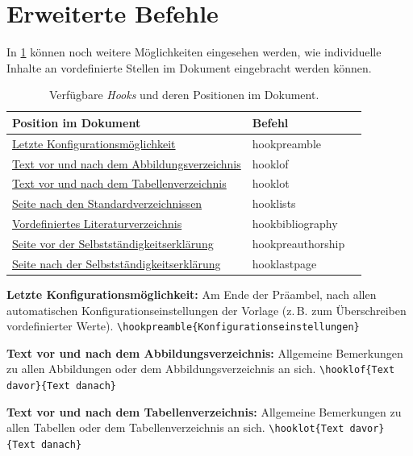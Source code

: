 	\section{Erweiterte Befehle}
	
	In \cref{tab:hooks} können noch weitere Möglichkeiten eingesehen werden, wie individuelle Inhalte an vordefinierte Stellen im Dokument eingebracht werden können.
	
	\begin{table}[!htb]
		\centering
		\caption{Verfügbare \textit{Hooks} und deren Positionen im Dokument.}
		\label{tab:hooks}
		\begin{tabular}{lll}
			\toprule
			\textbf{Position im Dokument} & \textbf{Befehl} \\
			\midrule
			\hyperref[cmd:hookpreamble]{Letzte Konfigurationsmöglichkeit} & hookpreamble \\
			\hyperref[cmd:hooklof]{Text vor und nach dem Abbildungsverzeichnis} & hooklof \\
			\hyperref[cmd:hooklot]{Text vor und nach dem Tabellenverzeichnis} & hooklot \\
			\hyperref[cmd:hooklists]{Seite nach den Standardverzeichnissen} & hooklists \\
			\hyperref[cmd:hookbibliography]{Vordefiniertes Literaturverzeichnis} & hookbibliography \\
			\hyperref[cmd:hookpreauthorship]{Seite vor der Selbstständigkeitserklärung} & hookpreauthorship \\
			\hyperref[cmd:hooklastpage]{Seite nach der Selbstständigkeitserklärung} & hooklastpage \\	
			\bottomrule
		\end{tabular}
	\end{table}
	
	\textbf{Letzte Konfigurationsmöglichkeit:}\label{cmd:hookpreamble}
	Am Ende der Präambel, nach allen automatischen Konfigurationseinstellungen der Vorlage (z.\,B. zum Überschreiben vordefinierter Werte).
	\newline
	\verb|\hookpreamble{Konfigurationseinstellungen}|
	
	\textbf{Text vor und nach dem Abbildungsverzeichnis:}\label{cmd:hooklof}
	Allgemeine Bemerkungen zu allen Abbildungen oder dem Abbildungsverzeichnis an sich.
	\newline
	\verb|\hooklof{Text davor}{Text danach}|
	
	\textbf{Text vor und nach dem Tabellenverzeichnis:}\label{cmd:hooklot}
	Allgemeine Bemerkungen zu allen Tabellen oder dem Tabellenverzeichnis an sich.
	\newline
	\verb|\hooklot{Text davor}{Text danach}|
	
